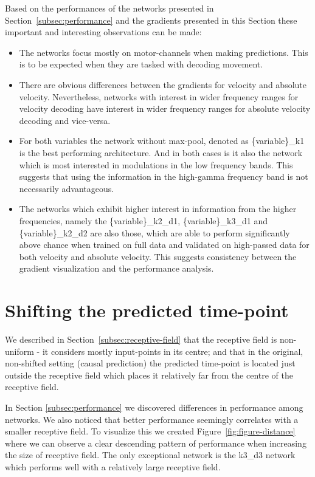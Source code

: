Based on the performances of the networks presented in Section~\ref{subsec:performance} and the gradients presented in this Section these important and interesting observations can be made:

\begin{itemize}
    \item The networks focus mostly on motor-channels when making predictions.
This is to be expected when they are tasked with decoding movement.
    \item There are obvious differences between the gradients for velocity and absolute velocity.
    Nevertheless, networks with interest in wider frequency ranges for velocity decoding have interest in wider frequency ranges for absolute velocity decoding and vice-versa.
    \item For both variables the network without max-pool, denoted as \{variable\}\_k1 is the best performing architecture.
    And in both cases is it also the network which is most interested in modulations in the low frequency bands.
    This suggests that using the information in the high-gamma frequency band is not necessarily advantageous.
    \item The networks which exhibit higher interest in information from the higher frequencies, namely the \{variable\}\_k2\_d1, \{variable\}\_k3\_d1 and \{variable\}\_k2\_d2 are also those, which are able to perform significantly above chance when trained on full data and validated on high-passed data for both velocity and absolute velocity.
    This suggests consistency between the gradient visualization and the performance analysis.

\end{itemize}

\section{Shifting the predicted time-point}\label{sec:shifting-the-predicted-time-point}
We described in Section~\ref{subsec:receptive-field} that the receptive field is non-uniform - it considers mostly input-points in its centre; and that in the original, non-shifted setting (causal prediction) the predicted time-point is located just outside the receptive field which places it relatively far from the centre of the receptive field. 

In Section \ref{subsec:performance} we discovered differences in performance among networks. We also noticed that better performance seemingly correlates with a smaller receptive field. To visualize this we created Figure~\ref{fig:figure-distance} where we can observe a clear descending pattern of performance when increasing the size of receptive field. The only exceptional network is the k3\_d3 network which performs well with a relatively large receptive field. 

